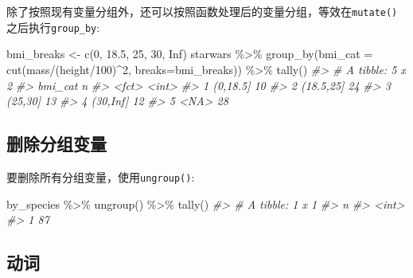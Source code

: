 \documentclass[
]{book}
\newenvironment{Shaded}{\begin{snugshade}}{\end{snugshade}}
\newcommand{\AttributeTok}[1]{\textcolor[rgb]{0.77,0.63,0.00}{#1}}
\newcommand{\CommentTok}[1]{\textcolor[rgb]{0.56,0.35,0.01}{\textit{#1}}}
\newcommand{\ConstantTok}[1]{\textcolor[rgb]{0.00,0.00,0.00}{#1}}
\newcommand{\DecValTok}[1]{\textcolor[rgb]{0.00,0.00,0.81}{#1}}
\newcommand{\FloatTok}[1]{\textcolor[rgb]{0.00,0.00,0.81}{#1}}
\newcommand{\FunctionTok}[1]{\textcolor[rgb]{0.00,0.00,0.00}{#1}}
\newcommand{\NormalTok}[1]{#1}
\newcommand{\OtherTok}[1]{\textcolor[rgb]{0.56,0.35,0.01}{#1}}
\newcommand{\SpecialCharTok}[1]{\textcolor[rgb]{0.00,0.00,0.00}{#1}}
\begin{document}
除了按照现有变量分组外，还可以按照函数处理后的变量分组，等效在\texttt{mutate()}之后执行\texttt{group\_by}:

\begin{Shaded}
\begin{Highlighting}[]
\NormalTok{bmi\_breaks }\OtherTok{\textless{}{-}} \FunctionTok{c}\NormalTok{(}\DecValTok{0}\NormalTok{, }\FloatTok{18.5}\NormalTok{, }\DecValTok{25}\NormalTok{, }\DecValTok{30}\NormalTok{, }\ConstantTok{Inf}\NormalTok{)}
\NormalTok{starwars }\SpecialCharTok{\%\textgreater{}\%}
  \FunctionTok{group\_by}\NormalTok{(}\AttributeTok{bmi\_cat =} \FunctionTok{cut}\NormalTok{(mass}\SpecialCharTok{/}\NormalTok{(height}\SpecialCharTok{/}\DecValTok{100}\NormalTok{)}\SpecialCharTok{\^{}}\DecValTok{2}\NormalTok{, }\AttributeTok{breaks=}\NormalTok{bmi\_breaks)) }\SpecialCharTok{\%\textgreater{}\%}
  \FunctionTok{tally}\NormalTok{()}
\CommentTok{\#\textgreater{} \# A tibble: 5 x 2}
\CommentTok{\#\textgreater{}   bmi\_cat       n}
\CommentTok{\#\textgreater{}   \textless{}fct\textgreater{}     \textless{}int\textgreater{}}
\CommentTok{\#\textgreater{} 1 (0,18.5]     10}
\CommentTok{\#\textgreater{} 2 (18.5,25]    24}
\CommentTok{\#\textgreater{} 3 (25,30]      13}
\CommentTok{\#\textgreater{} 4 (30,Inf]     12}
\CommentTok{\#\textgreater{} 5 \textless{}NA\textgreater{}         28}
\end{Highlighting}
\end{Shaded}

\hypertarget{ux5220ux9664ux5206ux7ec4ux53d8ux91cf}{%
\subsection{删除分组变量}\label{ux5220ux9664ux5206ux7ec4ux53d8ux91cf}}

要删除所有分组变量，使用\texttt{ungroup()}:

\begin{Shaded}
\begin{Highlighting}[]
\NormalTok{by\_species }\SpecialCharTok{\%\textgreater{}\%}
  \FunctionTok{ungroup}\NormalTok{() }\SpecialCharTok{\%\textgreater{}\%}
  \FunctionTok{tally}\NormalTok{()}
\CommentTok{\#\textgreater{} \# A tibble: 1 x 1}
\CommentTok{\#\textgreater{}       n}
\CommentTok{\#\textgreater{}   \textless{}int\textgreater{}}
\CommentTok{\#\textgreater{} 1    87}
\end{Highlighting}
\end{Shaded}

\hypertarget{ux52a8ux8bcd}{%
\subsection{动词}\label{ux52a8ux8bcd}}
\end{document}
